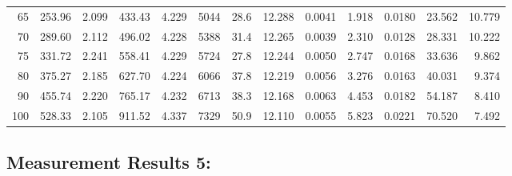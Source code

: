 \documentclass[10pt]{article}
\begin{document}
{\begin{tabular}{|r|rr|rr|rr|rr|rr|r|r|}
       65 &       253.96 &        2.099 &       433.43 &        4.229 &         5044 &         28.6 &       12.288 &       0.0041 &        1.918 &       0.0180 &       23.562 &       10.779 \\
       70 &       289.60 &        2.112 &       496.02 &        4.228 &         5388 &         31.4 &       12.265 &       0.0039 &        2.310 &       0.0128 &       28.331 &       10.222 \\
       75 &       331.72 &        2.241 &       558.41 &        4.229 &         5724 &         27.8 &       12.244 &       0.0050 &        2.747 &       0.0168 &       33.636 &        9.862 \\
       80 &       375.27 &        2.185 &       627.70 &        4.224 &         6066 &         37.8 &       12.219 &       0.0056 &        3.276 &       0.0163 &       40.031 &        9.374 \\
       90 &       455.74 &        2.220 &       765.17 &        4.232 &         6713 &         38.3 &       12.168 &       0.0063 &        4.453 &       0.0182 &       54.187 &        8.410 \\
      100 &       528.33 &        2.105 &       911.52 &        4.337 &         7329 &         50.9 &       12.110 &       0.0055 &        5.823 &       0.0221 &       70.520 &        7.492 \\
\hline
\end{tabular}
}



\subsection*{\large \bf Measurement Results 5:}
\end{document}
